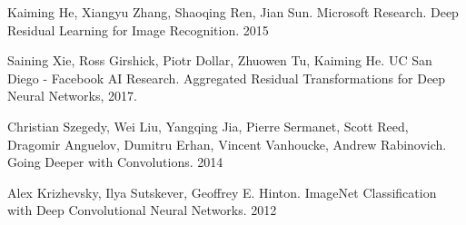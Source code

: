 \documentclass{article}
\begin{document}
\begin{thebibliography}{1}
	Kaiming He, Xiangyu Zhang, Shaoqing Ren, Jian Sun. Microsoft Research. 
	Deep Residual Learning for Image Recognition. 2015
	
	Saining Xie, Ross Girshick, Piotr Dollar, Zhuowen Tu, Kaiming He. UC San Diego - Facebook AI Research. Aggregated Residual Transformations for Deep Neural Networks, 2017.
	
	Christian Szegedy, Wei Liu, Yangqing Jia, Pierre Sermanet, Scott Reed, Dragomir Anguelov, Dumitru Erhan, Vincent Vanhoucke, Andrew Rabinovich. Going Deeper with Convolutions. 2014
	
	Alex Krizhevsky, Ilya Sutskever, Geoffrey E. Hinton. ImageNet Classification with Deep Convolutional
	Neural Networks. 2012
	
	
	
	
\end{thebibliography}
\end{document}
